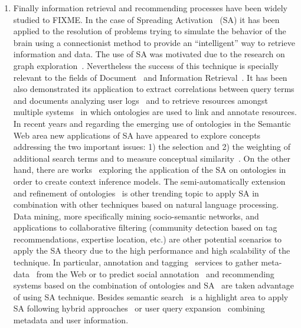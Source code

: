\begin{enumerate}
 \item Finally information retrieval and recommending processes have been widely studied to FIXME. In the case of Spreading Activation~\cite{Collins_Loftus_1975} (SA) it has been applied to the resolution
  of problems trying to simulate the behavior of the brain using a connectionist method to provide an ``intelligent'' way to retrieve information and data. The use of SA was motivated 
  due to the research on graph exploration~\cite{Scott1981,AndersonTheory}. Nevertheless the success of this technique is specially relevant to the fields of Document~\cite{turtle91inference} 
  and Information Retrieval~\cite{Cohen1987}. It has been also demonstrated its application to extract correlations between query terms and documents analyzing user 
  logs~\cite{Cui03} and to retrieve resources amongst multiple systems~\cite{Schumacher+2008search} 
  in which ontologies are used to link and annotate resources. In recent years and regarding the emerging use of ontologies in the Semantic Web area new applications of SA have 
  appeared to explore concepts~\cite{Qiu93,Chen95} addressing the two important issues: 1) the selection and 2) the weighting of 
  additional search terms and to measure conceptual similarity~\cite{gouws-vanrooyen-engelbrecht:2010:CCSR}. 
  On the other hand, there are works~\cite{DBLP:journals/cogsr/KatiforiVD10} exploring the application of the SA on ontologies in order to create context inference models. The 
  semi-automatically extension and refinement of ontologies~\cite{liu_et_al_2005} is other trending topic to apply SA in combination with other techniques based on natural language processing. 
  Data mining, more specifically mining socio-semantic networks\cite{paper:troussov:2008}, and applications to collaborative filtering (community detection based on tag recommendations, expertise location, etc.) 
  are other potential scenarios to apply the SA theory due to the high performance and high scalability of the technique. In particular, 
  annotation and tagging~\cite{labraTagging2007} services to gather meta-data~\cite{GelgiVD05} from the Web or to predict social annotation~\cite{Chen:2007:PSA:1780653.1780702} and recommending 
  systems based on the combination of ontologies and SA~\cite{citeulike:3779904} are taken advantage of using SA technique. Besides 
  semantic search~\cite{conf-sofsem-Suchal08} is a highlight area to apply SA following hybrid approaches~\cite{bopaEstonia,RochaSA04} or user query expansion~\cite{767402} combining metadata 
  and user information.

 \end{enumerate}
  
